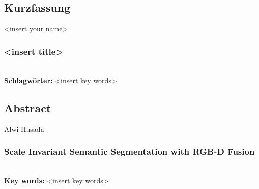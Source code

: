 
\subsection*{Kurzfassung}

<insert your name>
\subsubsection*{<insert title>}


%
\mbox{}\\[0.5\baselineskip]\noindent
\textbf{Schlagwörter:} 
<insert key words>
\clearpage
\subsection*{Abstract}

Alwi Husada
\subsubsection*{Scale Invariant Semantic Segmentation with RGB-D Fusion}


%
\mbox{}\\[0.5\baselineskip]\noindent
\textbf{Key words:} 
<insert key words>